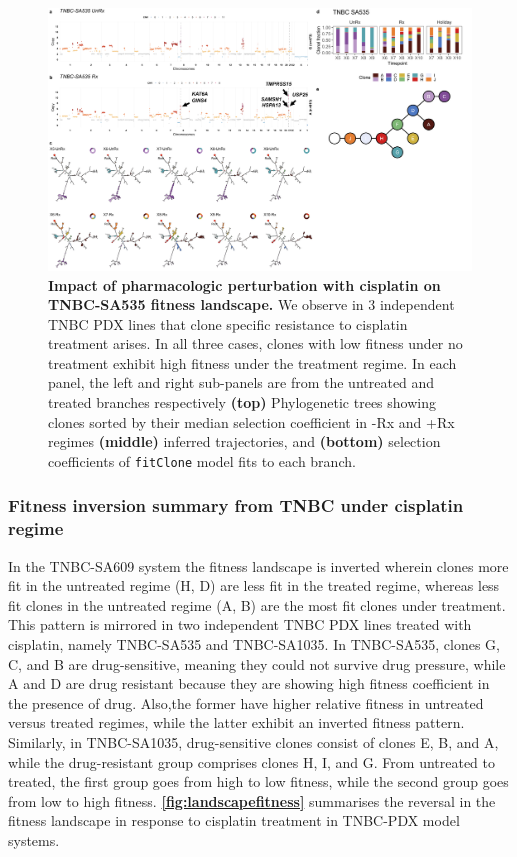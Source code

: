 \begin{figure}
\centering
\includegraphics[width=\textwidth]{Figures/chap4/genePlot535.png}
	
\caption[Impact of pharmacologic perturbation with cisplatin on TNBC-SA535 fitness landscape.]
	{\small
	\textbf{Impact of pharmacologic perturbation with cisplatin on TNBC-SA535 fitness landscape.}
	     We observe in 3 independent TNBC PDX lines that clone specific resistance to cisplatin treatment arises. In all three cases, clones with low fitness under no treatment exhibit high fitness under the treatment regime. In each panel, the left and right sub-panels are from the untreated and treated branches respectively \textbf{(top)} Phylogenetic trees showing clones sorted by their median selection coefficient in -Rx and +Rx regimes  \textbf{(middle)} inferred trajectories, and  \textbf{(bottom)} selection coefficients of \texttt{fitClone} model fits to each branch.
	}
	\label{fig:landscapefitness}
\end{figure}


\subsubsection{Fitness inversion summary from TNBC under cisplatin regime }
In the TNBC-SA609 system the fitness landscape is inverted wherein
clones more fit in the untreated regime (H, D) are less fit in the treated regime, whereas less fit clones in the untreated regime (A, B) are the most fit clones under treatment. This pattern is
mirrored in two independent TNBC PDX lines treated with cisplatin, namely TNBC-SA535 and TNBC-SA1035. In TNBC-SA535, clones G, C, and B are drug-sensitive, meaning they could not survive drug pressure, while A and D are drug resistant because they are showing high fitness coefficient in the presence of drug. Also,the former have higher relative fitness in untreated versus treated regimes, while the latter exhibit an inverted fitness pattern. Similarly, in TNBC-SA1035, drug-sensitive clones consist of clones E, B, and A, while the drug-resistant group comprises clones H, I, and G. From untreated
to treated, the first group goes from high to low fitness, while the second group goes from low to high fitness. \textbf{\autoref{fig:landscapefitness}} summarises the reversal in the fitness landscape in response to cisplatin treatment in TNBC-PDX model systems.

